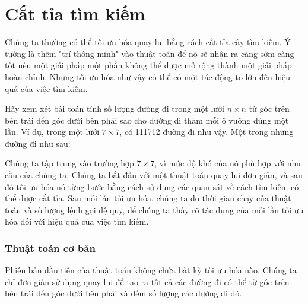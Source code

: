 \section{Cắt tỉa tìm kiếm}

Chúng ta thường có thể tối ưu hóa quay lui
bằng cách cắt tỉa cây tìm kiếm.
Ý tưởng là thêm "trí thông minh" vào thuật toán
để nó sẽ nhận ra càng sớm càng tốt
nếu một giải pháp một phần không thể được mở rộng
thành một giải pháp hoàn chỉnh.
Những tối ưu hóa như vậy có thể có một tác động to lớn
đến hiệu quả của việc tìm kiếm.

Hãy xem xét bài toán
tính số lượng đường đi
trong một lưới $n \times n$ từ góc trên bên trái
đến góc dưới bên phải sao cho
đường đi thăm mỗi ô vuông đúng một lần.
Ví dụ, trong một lưới $7 \times 7$,
có 111712 đường đi như vậy.
Một trong những đường đi như sau:

\begin{center}
\end{center}

Chúng ta tập trung vào trường hợp $7 \times 7$,
vì mức độ khó của nó phù hợp với nhu cầu của chúng ta.
Chúng ta bắt đầu với một thuật toán quay lui đơn giản,
và sau đó tối ưu hóa nó từng bước bằng cách sử dụng các quan sát
về cách tìm kiếm có thể được cắt tỉa.
Sau mỗi lần tối ưu hóa, chúng ta đo thời gian chạy
của thuật toán và số lượng lệnh gọi đệ quy,
để chúng ta thấy rõ tác dụng của mỗi
lần tối ưu hóa đối với hiệu quả của việc tìm kiếm.

\subsubsection{Thuật toán cơ bản}

Phiên bản đầu tiên của thuật toán không chứa
bất kỳ tối ưu hóa nào. Chúng ta chỉ đơn giản sử dụng quay lui để tạo ra
tất cả các đường đi có thể từ góc trên bên trái đến
góc dưới bên phải và đếm số lượng các đường đi đó.

